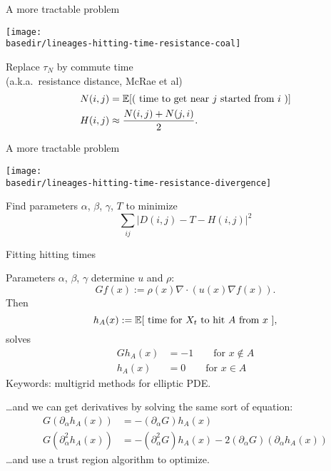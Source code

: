 \documentclass{beamer}
\newcommand{\basedir}{files}
\begin{document}
\begin{frame}{A more tractable problem}
  \begin{center}
      \texttt{[image: \\basedir/lineages-hitting-time-resistance-coal]}
  \end{center}
  Replace {\oldthing $\tau_N$} by commute time \\
  (a.k.a.\ {\newthing resistance distance}, McRae et al)
  \begin{align*}
    N(i,j) &= \mathbb{E}[ \text{( time to get near $j$ started from $i$ )} ] \\
    H(i,j) &\approx \frac{ N(i,j) + N(j,i) }{2} .
  \end{align*}
\end{frame}

\begin{frame}{A more tractable problem}
  \begin{center}
      \texttt{[image: \\basedir/lineages-hitting-time-resistance-divergence]}
  \end{center}
  Find parameters $\alpha$, $\beta$, $\gamma$, $T$ to minimize
  \[
  \sum_{ij} | D(i,j) - T - H(i,j) |^2
  \]
\end{frame}

\begin{frame}{Fitting hitting times}

  Parameters $\alpha$, $\beta$, $\gamma$ determine $u$ and $\rho$:
  \[
  Gf(x) := \rho(x) \nabla \cdot ( u(x) \nabla f(x) ) .
  \]
  Then
  \[
  h_A(x) := \mathbb{E}[ \text{ time for $X_t$ to hit $A$ from $x$ } ] ,
  \]
  solves
  \begin{align*}
    G h_A(x) &= -1  \qquad \text{for } x \notin A \\
    h_A(x) &= 0  \qquad \text{for } x \in A 
  \end{align*}
  {\struct Keywords:} multigrid methods for elliptic PDE.
  

  \ldots and we can get derivatives by solving the same sort of equation:
  \begin{align*}
    G (\partial_\alpha h_A(x)) &= -(\partial_\alpha G) h_A(x)  \\
    G (\partial_\alpha^2 h_A(x)) &= -(\partial_\alpha^2 G) h_A(x) -2 (\partial_\alpha G)(\partial_\alpha h_A(x))
  \end{align*}
  \ldots and use a \alert{trust region algorithm} to optimize.

\end{frame}

\begin{frame}{}
\end{frame}
\end{document}
